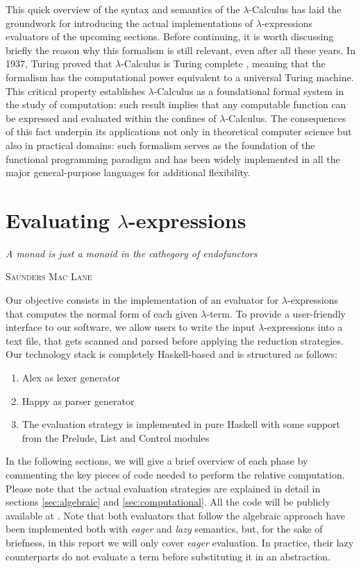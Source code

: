 \documentclass{article}
\begin{document}
This quick overview of the syntax and semantics of the $\lambda$-Calculus has laid the groundwork for introducing the actual implementations of $\lambda$-expressions evaluators of the upcoming sections. Before continuing, it is worth discussing briefly the reason why this formalism is still relevant, even after all these years. In 1937, Turing proved that $\lambda$-Calculus is Turing complete \cite{turing}, meaning that the formalism has the computational power equivalent to a universal Turing machine. This critical property establishes $\lambda$-Calculus as a foundational formal system in the study of computation: such result implies that any computable function can be expressed and evaluated within the confines of $\lambda$-Calculus. The consequences of this fact underpin its applications not only in theoretical computer science but also in practical domains: such formalism serves as the foundation of the functional programming paradigm and has been widely implemented in all the major general-purpose languages for additional flexibility.

\section{Evaluating $\lambda$-expressions}\label{sec:evaluation}

\epigraph{\textit{A monad is just a monoid in the cathegory of endofunctors}}{\textsc{Saunders Mac Lane}\cite{mac}}

Our objective consists in the implementation of an evaluator for $\lambda$-expressions that computes the normal form of each given $\lambda$-term. To provide a user-friendly interface to our software, we allow users to write the input $\lambda$-expressions into a text file, that gets scanned and parsed before applying the reduction strategies. Our technology stack is completely Haskell-based and is structured as follows:

\begin{enumerate}
    \item Alex \cite{alex} as lexer generator
    \item Happy \cite{happy} as parser generator
    \item The evaluation strategy is implemented in pure Haskell with some support from the Prelude, List and Control modules
\end{enumerate}

In the following sections, we will give a brief overview of each phase by commenting the key pieces of code needed to perform the relative computation. Please note that the actual evaluation strategies are explained in detail in sections \ref{sec:algebraic} and \ref{sec:computational}. All the code will be publicly available at \cite{denis}. Note that both evaluators that follow the algebraic approach have been implemented both with \textit{eager} and \textit{lazy} semantics, but, for the sake of briefness, in this report we will only cover \textit{eager} evaluation. In practice, their lazy counterparts do not evaluate a term before substituting it in an abstraction.
\end{document}
